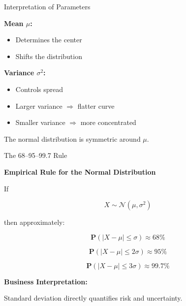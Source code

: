 \documentclass{beamer}
\begin{document}
\begin{frame}{Interpretation of Parameters}

\textbf{Mean $\mu$:}
\begin{itemize}
    \item Determines the center
    \item Shifts the distribution
\end{itemize}

\vspace{0.3cm}

\textbf{Variance $\sigma^2$:}
\begin{itemize}
    \item Controls spread
    \item Larger variance $\Rightarrow$ flatter curve
    \item Smaller variance $\Rightarrow$ more concentrated
\end{itemize}

\vspace{0.5cm}

The normal distribution is symmetric around $\mu$.

\end{frame}

\begin{frame}{The 68--95--99.7 Rule}

\textbf{Empirical Rule for the Normal Distribution}

If

\[
X \sim \mathcal{N}(\mu, \sigma^2)
\]

then approximately:

\[
\mathbf{P}(|X - \mu| \le \sigma) \approx 68\%
\]

\[
\mathbf{P}(|X - \mu| \le 2\sigma) \approx 95\%
\]

\[
\mathbf{P}(|X - \mu| \le 3\sigma) \approx 99.7\%
\]

\vspace{0.5cm}

\textbf{Business Interpretation:}

Standard deviation directly quantifies risk and uncertainty.

\end{frame}
\end{document}
